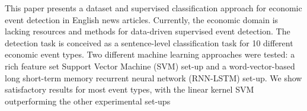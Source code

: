 This paper presents a dataset and supervised classification approach for economic event detection in English news articles. Currently, the economic domain is lacking resources and methods for data-driven supervised event detection. The detection task is conceived as a sentence-level classification task for 10 different economic event types. Two different machine learning approaches were tested: a rich feature set Support Vector Machine (SVM) set-up and a word-vector-based long short-term memory recurrent neural network (RNN-LSTM) set-up. We show satisfactory results for most event types, with the linear kernel SVM outperforming the other experimental set-ups
